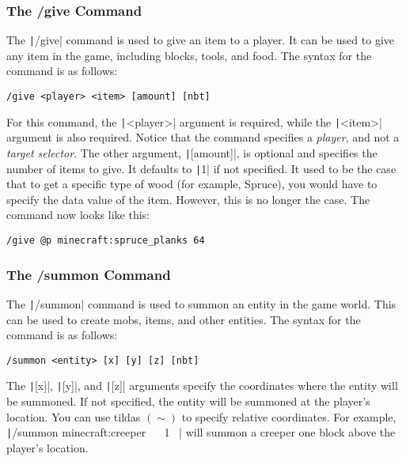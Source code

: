 \subsubsection{The /give Command}
\label{subsubsec:give}

The \texttt|/give| command is used to give an item to a player. It can be used to give any item in the game, including blocks, tools, and food. The syntax for the command is as follows:
\begin{verbatim}
/give <player> <item> [amount] [nbt]
\end{verbatim}
For this command, the \texttt|<player>| argument is required, while the \texttt|<item>| argument is also required. Notice that the command specifies a \textit{player}, and not a \textit{target selector}. The other argument, \texttt|[amount]|, is optional and specifies the number of items to give. It defaults to \texttt|1| if not specified. It used to be the case that to get a specific type of wood (for example, Spruce), you would have to specify the data value of the item. However, this is no longer the case. The command now looks like this:
\begin{verbatim}
/give @p minecraft:spruce_planks 64
\end{verbatim}

\subsubsection{The /summon Command}
\label{subsubsec:summon}

The \texttt|/summon| command is used to summon an entity in the game world. This can be used to create mobs, items, and other entities. The syntax for the command is as follows:
\begin{verbatim}
/summon <entity> [x] [y] [z] [nbt]
\end{verbatim}
The \texttt|[x]|, \texttt|[y]|, and \texttt|[z]| arguments specify the coordinates where the entity will be summoned. If not specified, the entity will be summoned at the player's location. You can use tildas \((\sim)\) to specify relative coordinates. For example, \texttt|/summon minecraft:creeper ~ ~1 ~| will summon a creeper one block above the player's location. 

